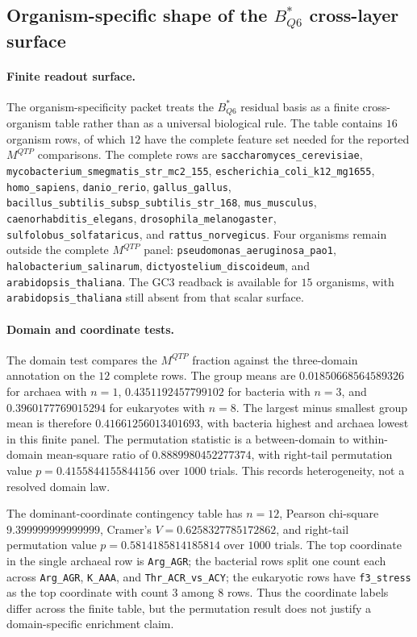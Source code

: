 
\subsection{Organism-specific shape of the $B^*_{Q6}$ cross-layer surface}
\label{sec:bioreality-q6-organism-specificity-meta}

\paragraph{Finite readout surface.}
The organism-specificity packet treats the $B^*_{Q6}$ residual basis as a finite cross-organism table rather than as a universal biological rule. The table contains $16$ organism rows, of which $12$ have the complete feature set needed for the reported $M^{QTP}$ comparisons. The complete rows are \texttt{saccharomyces\_cerevisiae}, \texttt{mycobacterium\_smegmatis\_str\_mc2\_155}, \texttt{escherichia\_coli\_k12\_mg1655}, \texttt{homo\_sapiens}, \texttt{danio\_rerio}, \texttt{gallus\_gallus}, \texttt{bacillus\_subtilis\_subsp\_subtilis\_str\_168}, \texttt{mus\_musculus}, \texttt{caenorhabditis\_elegans}, \texttt{drosophila\_melanogaster}, \texttt{sulfolobus\_solfataricus}, and \texttt{rattus\_norvegicus}. Four organisms remain outside the complete $M^{QTP}$ panel: \texttt{pseudomonas\_aeruginosa\_pao1}, \texttt{halobacterium\_salinarum}, \texttt{dictyostelium\_discoideum}, and \texttt{arabidopsis\_thaliana}. The GC3 readback is available for $15$ organisms, with \texttt{arabidopsis\_thaliana} still absent from that scalar surface.

\paragraph{Domain and coordinate tests.}
The domain test compares the $M^{QTP}$ fraction against the three-domain annotation on the $12$ complete rows. The group means are $0.01850668564589326$ for archaea with $n=1$, $0.4351192457799102$ for bacteria with $n=3$, and $0.3960177769015294$ for eukaryotes with $n=8$. The largest minus smallest group mean is therefore $0.41661256013401693$, with bacteria highest and archaea lowest in this finite panel. The permutation statistic is a between-domain to within-domain mean-square ratio of $0.8889980452277374$, with right-tail permutation value $p=0.4155844155844156$ over $1000$ trials. This records heterogeneity, not a resolved domain law.

The dominant-coordinate contingency table has $n=12$, Pearson chi-square $9.399999999999999$, Cramer's $V=0.6258327785172862$, and right-tail permutation value $p=0.5814185814185814$ over $1000$ trials. The top coordinate in the single archaeal row is \texttt{Arg\_AGR}; the bacterial rows split one count each across \texttt{Arg\_AGR}, \texttt{K\_AAA}, and \texttt{Thr\_ACR\_vs\_ACY}; the eukaryotic rows have \texttt{f3\_stress} as the top coordinate with count $3$ among $8$ rows. Thus the coordinate labels differ across the finite table, but the permutation result does not justify a domain-specific enrichment claim.

